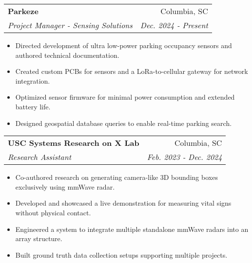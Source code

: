 \documentclass[letterpaper,12pt]{article}
\makeatletter
\newcommand{\resumeItem}[2]{
  \item\small{
    \textbf{#1}{: #2 \vspace{-2pt}}
  }
}
\newcommand{\resumeItemLine}[1]{
  \item\small{
    {#1 \vspace{-3pt}}
  }
}
\newcommand{\resumeSubheading}[4]{
  \vspace{-3pt}\item
    \begin{tabular*}{0.97\textwidth}{l@{\extracolsep{\fill}}r}
      \textbf{#1} & #2 \\
      \textit{\small#3} & \textit{\small #4} \\
    \end{tabular*}\vspace{-7pt}
}
\newcommand{\resumeItemListStart}{\begin{itemize}}
\newcommand{\resumeItemListEnd}{\end{itemize}\vspace{-5pt}}
\makeatother
\begin{document}
    \resumeSubheading
      {Parkeze}{Columbia, SC}
      {Project Manager - Sensing Solutions}{Dec. 2024 - Present}
      \resumeItemListStart
        \resumeItemLine{Directed development of ultra low-power parking occupancy sensors and authored technical documentation.}
        \resumeItemLine{Created custom PCBs for sensors and a LoRa-to-cellular gateway for network integration.}
        \resumeItemLine{Optimized sensor firmware for minimal power consumption and extended battery life.}
        \resumeItemLine{Designed geospatial database queries to enable real-time parking search.}
      \resumeItemListEnd
      
    \resumeSubheading
      {USC Systems Research on X Lab}{Columbia, SC}
      {Research Assistant}{Feb. 2023 - Dec. 2024}
      \resumeItemListStart
        \resumeItemLine{Co-authored research on generating camera-like 3D bounding boxes exclusively using mmWave radar.}
        \resumeItemLine{Developed and showcased a live demonstration for measuring vital signs without physical contact.}
        \resumeItemLine{Engineered a system to integrate multiple standalone mmWave radars into an array structure.}
        \resumeItemLine{Built ground truth data collection setups supporting multiple projects.}
      \resumeItemListEnd

\end{document}
